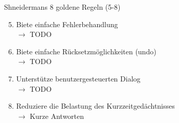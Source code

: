 \documentclass[
  10pt
, handout
]{beamer}
\begin{document}
\begin{frame}{Shneidermans 8 goldene Regeln (5-8)}
  \begin{enumerate}
    \setcounter{enumi}{4}
    \item<+-> Biete einfache Fehlerbehandlung \\ $\rightarrow$ TODO
    \item<+-> Biete einfache Rücksetzmöglichkeiten (undo) \\ $\rightarrow$ TODO
    \item<+-> Unterstütze benutzergesteuerten Dialog \\ $\rightarrow$ TODO
    \item<+-> Reduziere die Belastung des Kurzzeitgedächtnisses \\ $\rightarrow$ Kurze Antworten
  \end{enumerate}
\end{frame}
\end{document}
